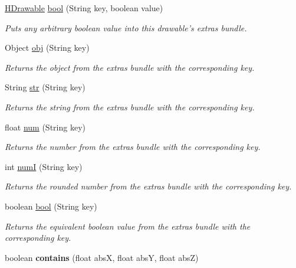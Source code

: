 \begin{DoxyCompactItemize}
\hyperlink{classhype_1_1core_1_1drawable_1_1_h_drawable}{H\-Drawable} \hyperlink{classhype_1_1core_1_1drawable_1_1_h_drawable_a5df0b54383b13fd0d121d78af53b125a}{bool} (String key, boolean value)
\begin{DoxyCompactList}\small\item\em Puts any arbitrary boolean value into this drawable's {\itshape extras bundle}. \end{DoxyCompactList}\item 
Object \hyperlink{classhype_1_1core_1_1drawable_1_1_h_drawable_a014b66534bafbca10e5d8337c644b30a}{obj} (String key)
\begin{DoxyCompactList}\small\item\em Returns the object from the {\itshape extras bundle} with the corresponding key. \end{DoxyCompactList}\item 
String \hyperlink{classhype_1_1core_1_1drawable_1_1_h_drawable_aeb66f7edfc095b6f827beb6c13caeb6a}{str} (String key)
\begin{DoxyCompactList}\small\item\em Returns the string from the {\itshape extras bundle} with the corresponding key. \end{DoxyCompactList}\item 
float \hyperlink{classhype_1_1core_1_1drawable_1_1_h_drawable_a5f983b4eb6b918b30b8caf1acd5e7f84}{num} (String key)
\begin{DoxyCompactList}\small\item\em Returns the number from the {\itshape extras bundle} with the corresponding key. \end{DoxyCompactList}\item 
int \hyperlink{classhype_1_1core_1_1drawable_1_1_h_drawable_abf2d2f75635975c52449b493af18e696}{num\-I} (String key)
\begin{DoxyCompactList}\small\item\em Returns the rounded number from the {\itshape extras bundle} with the corresponding key. \end{DoxyCompactList}\item 
boolean \hyperlink{classhype_1_1core_1_1drawable_1_1_h_drawable_a05b3317714513026e65a83cd7820f49b}{bool} (String key)
\begin{DoxyCompactList}\small\item\em Returns the equivalent boolean value from the {\itshape extras bundle} with the corresponding key. \end{DoxyCompactList}\item 
\hypertarget{classhype_1_1core_1_1drawable_1_1_h_drawable_a38c86d2f7ddaba669808f0f3299f5205}{boolean {\bfseries contains} (float abs\-X, float abs\-Y, float abs\-Z)}\label{classhype_1_1core_1_1drawable_1_1_h_drawable_a38c86d2f7ddaba669808f0f3299f5205}


\end{DoxyCompactItemize}
